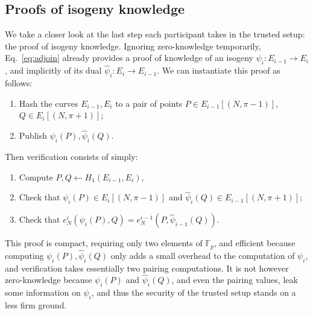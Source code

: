 \documentclass{llncs}
\newcommand{\F}{\mathbb{F}}
\begin{document}
\subsection{Proofs of isogeny knowledge}

We take a closer look at the last step each participant takes in the
trusted setup: the proof of isogeny knowledge. %
Ignoring zero-knowledge temporarily, Eq.~\eqref{eq:adjoin} already
provides a proof of knowledge of an isogeny $\psi_i:E_{i-1} \to E_i$,
and implicitly of its dual $\hat\psi_i: E_i \to E_{i-1}$.  
We can instantiate this proof as follows:
\begin{enumerate}
\item Hash the curves $E_{i-1},E_i$ to a pair of points
  $P\in E_{i-1}[(N,\pi-1)]$, $Q\in E_i[(N,\pi+1)]$;
\item Publish $\psi_i(P), \hat\psi_i(Q)$.
\end{enumerate}
Then verification consists of simply:
\begin{enumerate}
\item Compute $P,Q\gets H_1(E_{i-1},E_i)$,
\item Check that $\psi_i(P)\in E_i[(N,\pi-1)]$ and
  $\hat\psi_i(Q)\in E_{i-1}[(N,\pi+1)]$;
\item Check that
  $e_N^i(\psi_i(P),Q) = e_N^{i-1}(P,\hat\psi_{i-1}(Q))$.
\end{enumerate}

This proof is compact, requiring only two elements of $\F_p$, and
efficient because computing $\psi_i(P),\hat\psi_i(Q)$ only adds a
small overhead to the computation of $\psi_i$, and verification takes
essentially two pairing computations. %
It is not however zero-knowledge because $\psi_i(P)$ and
$\hat\psi_i(Q)$, and even the pairing values, leak some information on
$\psi_i$, and thus the security of the trusted setup stands on a less
firm ground.
\end{document}
